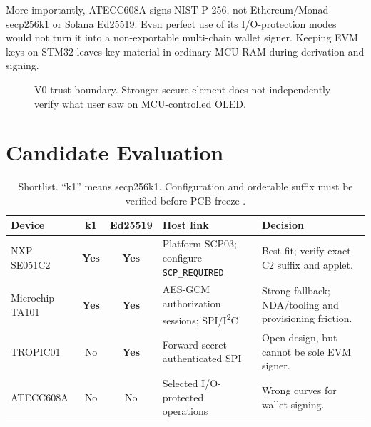 \documentclass[10pt]{article}
\newcommand{\yes}{\textbf{Yes}}
\newcommand{\no}{No}
\begin{document}
More importantly, ATECC608A signs NIST P-256, not Ethereum/Monad secp256k1 or
Solana Ed25519. Even perfect use of its I/O-protection modes would not turn it
into a non-exportable multi-chain wallet signer. Keeping EVM keys on STM32
leaves key material in ordinary MCU RAM during derivation and signing.

\begin{figure}[H]
\centering
{}
\caption{V0 trust boundary. Stronger secure element does not independently
verify what user saw on MCU-controlled OLED.}
\end{figure}

\section{Candidate Evaluation}
\begin{table}[H]
\centering\scriptsize
\renewcommand{\arraystretch}{1.15}
\begin{tabularx}{\textwidth}{@{}p{2.5cm}c c p{3.1cm}X@{}}
\toprule
\textbf{Device} & \textbf{k1} & \textbf{Ed25519} &
\textbf{Host link} & \textbf{Decision}\\
\midrule
NXP SE051C2 & \yes & \yes &
Platform SCP03; configure \texttt{SCP\_REQUIRED} &
Best fit; verify exact C2 suffix and applet.\\
Microchip TA101 & \yes & \yes &
AES-GCM authorization sessions; SPI/I\textsuperscript{2}C &
Strong fallback; NDA/tooling and provisioning friction.\\
TROPIC01 & \no & \yes &
Forward-secret authenticated SPI &
Open design, but cannot be sole EVM signer.\\
ATECC608A & \no & \no &
Selected I/O-protected operations &
Wrong curves for wallet signing.\\
\bottomrule
\end{tabularx}
\caption{Shortlist. ``k1'' means secp256k1. Configuration and orderable suffix
must be verified before PCB freeze \cite{se051-ds,se051-config,ta101,tropic}.}
\end{table}
\end{document}
